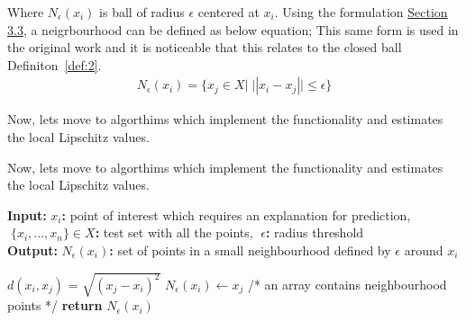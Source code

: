 \documentclass[english]{tktltiki2}
\theoremstyle{definition}
\newtheorem{definition}[thm]{Definition}
\theoremstyle{remark}
\newcommand{\multicommentsymbolstart}{/*}
\newcommand{\multicommentsymbolend}{*/}
\newcommand{\MultiLineComment}[2][\algorithmicindent]{\Statex \hspace{#1}\multicommentsymbolstart{} #2 \multicommentsymbolend{}}
\newcommand{\onespace}{\;}
\begin{document}
Where $N_{\epsilon}(x_{i})$ is ball of radius $\epsilon$ centered at $x_i$. Using the formulation \hyperref[sec:defining_similarity]{Section 3.3}, a neigrbourhood can be defined as below equation; This same form is used in the original work \citep{alvarez2018robustness} and it is noticeable that this relates to the closed ball Definiton~\ref{def:2}.
\begin{align*}
N_{\epsilon}(x_i) = \{x_j \in X|\;||x_i - x_j|| \leq \epsilon\}
\end{align*}

Now, lets move to algorthims which implement the functionality and estimates the local Lipschitz values.   


Now, lets move to algorthims which implement the functionality and estimates the local Lipschitz values.
\begin{algorithm}[H]
	\caption{$Neighborhood(x_i,\onespace X,\onespace \epsilon)$}
	\hspace*{\algorithmicindent} \textbf{Input}\textbf{:} $x_i$\textbf{:} point of interest which requires an explanation for prediction, $\onespace \{x_i,...,x_n\} \in X$\textbf{:} test set with all the points, $\onespace \epsilon$\textbf{:} radius threshold  \\
	\hspace*{\algorithmicindent} \textbf{Output}\textbf{:} $N_{\epsilon}(x_i)$\textbf{:} set of points in a small neighbourhood defined by $\epsilon$ around $x_i$  
	\begin{algorithmic}[1]
			\State $d(x_i, x_j)$ = $\sqrt{(x_j - x_i)^2}$
				\State $N_{\epsilon}(x_i) \gets x_j$
			\EndIf
		\EndFor
		\MultiLineComment[0\dimexpr\algorithmicindent]{an array contains neighbourhood points}
		\State \textbf{return} $N_{\epsilon}(x_i)$ 
	\end{algorithmic}
\end{algorithm}
\end{document}
